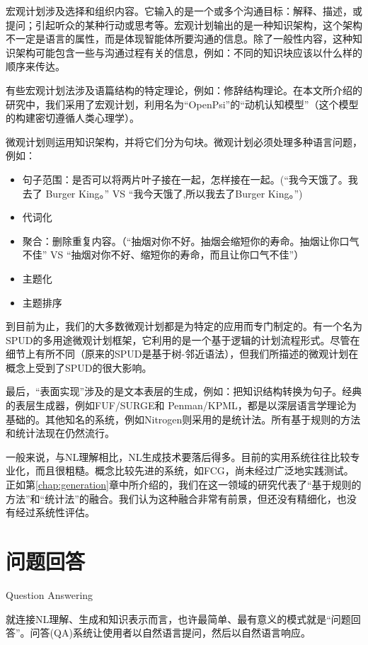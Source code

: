 宏观计划涉及选择和组织内容。它输入的是一个或多个沟通目标：解释、描述，或提问；引起听众的某种行动或思考等。宏观计划输出的是一种知识架构，这个架构不一定是语言的属性，而是体现智能体所要沟通的信息。除了一般性内容，这种知识架构可能包含一些与沟通过程有关的信息，例如：不同的知识块应该以什么样的顺序来传达。

有些宏观计划法涉及语篇结构的特定理论，例如：修辞结构理论\cite{Mann1987}。在本文所介绍的研究中，我们采用了宏观计划，利用名为“OpenPsi”的“动机认知模型”（这个模型的构建密切遵循人类心理学）。

微观计划则运用知识架构，并将它们分为句块。微观计划必须处理多种语言问题，例如：

\begin{itemize}
\item 句子范围：是否可以将两片叶子接在一起，怎样接在一起。(“我今天饿了。我去了 Burger King。” VS “我今天饿了,所以我去了Burger King。”)
\item 代词化
\item 聚合：删除重复内容。（“抽烟对你不好。抽烟会缩短你的寿命。抽烟让你口气不佳” VS “抽烟对你不好、缩短你的寿命，而且让你口气不佳”）
\item 主题化
\item 主题排序
\end{itemize}

到目前为止，我们的大多数微观计划都是为特定的应用而专门制定的。有一个名为SPUD\cite{Stone 1997}的多用途微观计划框架，它利用的是一个基于逻辑的计划流程形式。尽管在细节上有所不同（原来的SPUD是基于树-邻近语法），但我们所描述的微观计划在概念上受到了SPUD的很大影响。

最后，“表面实现”涉及的是文本表层的生成，例如：把知识结构转换为句子。经典的表层生成器，例如FUF/SURGE\cite{Elhadad1992}和 Penman/KPML\cite{Matthiessen1991}，都是以深层语言学理论为基础的。其他知名的系统，例如Nitrogen\cite{Langkilde1998}则采用的是统计法。所有基于规则的方法和统计法现在仍然流行。

一般来说，与NL理解相比，NL生成技术要落后得多。目前的实用系统往往比较专业化，而且很粗糙。概念比较先进的系统，如FCG，尚未经过广泛地实践测试。正如第\ref{chap:generation}章中所介绍的，我们在这一领域的研究代表了“基于规则的方法”和“统计法”的融合。我们认为这种融合非常有前景，但还没有精细化，也没有经过系统性评估。

\section{问题回答}{Question Answering}

就连接NL理解、生成和知识表示而言，也许最简单、最有意义的模式就是“问题回答”。问答(QA)系统让使用者以自然语言提问，然后以自然语言响应。


